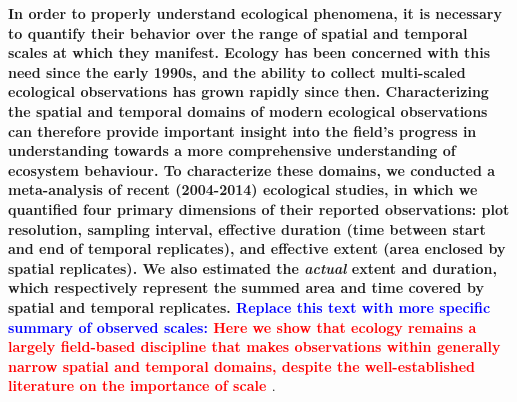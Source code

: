 \documentclass[12pt]{article}
\begin{document}
\textbf{In order to properly understand ecological phenomena, it is necessary to quantify their behavior over the range of spatial and temporal scales at which they manifest. Ecology has been concerned with this need since the early 1990s, and the ability to collect multi-scaled ecological observations has grown rapidly since then.  Characterizing the spatial and temporal domains of modern ecological observations can therefore provide important insight into the field's progress in understanding towards a more comprehensive understanding of ecosystem behaviour. To characterize these domains, we conducted a meta-analysis of recent (2004-2014) ecological studies, in which we quantified four primary dimensions of their reported observations: plot resolution, sampling interval, effective duration (time between start and end of temporal replicates), and effective extent (area enclosed by spatial replicates). We also estimated the \emph{actual} extent and duration, which respectively represent the summed area and time covered by spatial and temporal replicates. \textcolor{blue}{Replace this text with more specific summary of observed scales:} \textcolor{red}{Here we show that ecology remains a largely field-based discipline that makes observations within generally narrow spatial and temporal domains, despite the well-established literature on the importance of scale \cite{levin_problem_1992,chave_problem_2013,wiens_spatial_1989}}}. %
\end{document}
